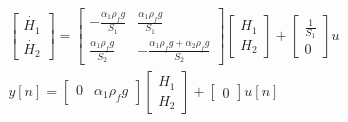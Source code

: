 \documentclass{article}
\begin{document}
\begin{equation}\label{eq:ss_cont}
 \begin{array}{l}
 
 \begin{bmatrix} \dot{H_1} \\ \dot{H_2} \end{bmatrix}  = 
 \begin{bmatrix} -\frac{\alpha_1 \rho_f g}{S_1} & \frac{\alpha_1 \rho_f g}{S_1}\\ 
  \frac{\alpha_1 \rho_f g}{S_2} & -\frac{\alpha_1 \rho_f g + \alpha_2 \rho_f g}{S_2} 
 \end{bmatrix}   \begin{bmatrix} H_1 \\ H_2 \end{bmatrix} + 
 \begin{bmatrix}\frac{1}{S_1} \\ 0\end{bmatrix}u  \\
 
 y[n]  = \begin{bmatrix} 0 & \alpha_1 \rho_f g \end{bmatrix}
 \begin{bmatrix} H_1 \\ H_2 \end{bmatrix} + 
 \begin{bmatrix} 0 \end{bmatrix} u[n]
 
 \end{array}
\end{equation}
\end{document}
